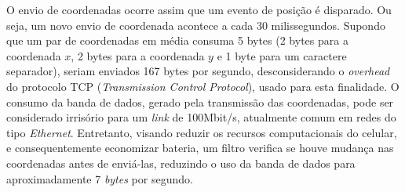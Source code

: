 O envio de coordenadas ocorre assim que um evento de posição é disparado. Ou seja, um novo envio de coordenada acontece a cada 30 milissegundos. Supondo que um par de coordenadas em média consuma 5 bytes (2 bytes para a coordenada $x$, 2 bytes para a coordenada $y$ e 1 byte para um caractere separador), seriam enviados 167 bytes por segundo, desconsiderando o \textit{overhead} do protocolo TCP (\textit{Transmission Control Protocol}), usado para esta finalidade. O consumo da banda de dados, gerado pela transmissão das coordenadas, pode ser considerado irrisório para um \textit{link} de 100Mbit/s, atualmente comum em redes do tipo \textit{Ethernet}. Entretanto, visando reduzir os recursos computacionais do celular, e consequentemente economizar bateria, um filtro verifica se houve mudança nas coordenadas antes de enviá-las, reduzindo o uso da banda de dados para aproximadamente 7 \textit{bytes} por segundo.\par

  